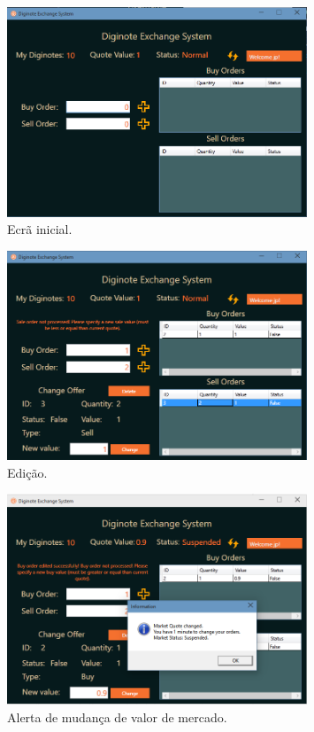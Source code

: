 \documentclass[12pt]{article}
\begin{document}
\begin{figure}[H]
    \centering
    \includegraphics[width=0.8\textwidth]{2.png}
    \caption{Ecrã inicial.}
    \label{fig:c2}
\end{figure}
\begin{figure}[H]
    \centering
    \includegraphics[width=0.8\textwidth]{3.png}
    \caption{Edição.}
    \label{fig:c3}
\end{figure}
\begin{figure}[H]
    \centering
    \includegraphics[width=0.8\textwidth]{4.png}
    \caption{Alerta de mudança de valor de mercado.}
    \label{fig:c4}
\end{figure}
\end{document}
